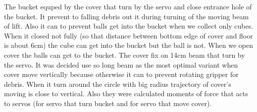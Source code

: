 The bucket equped by the cover that turn by the servo and close entrance hole of the bucket. It prevent to falling debris out it during turning of the moving beam of lift. Also it can to prevent balls get into the bucket when we collect only cubes. When it closed not fully (so that distance between bottom edge of cover and floor is about 6cm) the cube can get into the bucket but the ball is not. When we open cover the balls can get to the bucket.\newline
The cover fix on 14cm beam that turn by the servo. It was decided use so long beam as the most optimal variant when cover move vertically because otherwise it can to prevent rotating gripper for debris. When it turn around the circle with big radius trajectory of cover's moving is close to vertical. \newline
Also they were calculated moments of force that acts to servos (for servo that turn bucket and for servo that move cover).



\fillpage
